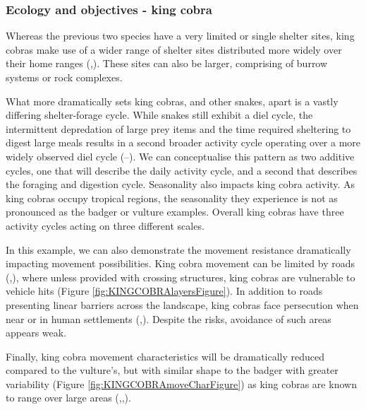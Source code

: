 \documentclass[10pt,a4paper]{article}
\begin{document}
\subsubsection{Ecology and objectives - king cobra}\label{ecology-and-objectives---king-cobra}

Whereas the previous two species have a very limited or single shelter sites, king cobras make use of a wider range of shelter sites distributed more widely over their home ranges (,).
These sites can also be larger, comprising of burrow systems or rock complexes.

What more dramatically sets king cobras, and other snakes, apart is a vastly differing shelter-forage cycle.
While snakes still exhibit a diel cycle, the intermittent depredation of large prey items and the time required sheltering to digest large meals results in a second broader activity cycle operating over a more widely observed diel cycle (--).
We can conceptualise this pattern as two additive cycles, one that will describe the daily activity cycle, and a second that describes the foraging and digestion cycle.
Seasonality also impacts king cobra activity.
As king cobras occupy tropical regions, the seasonality they experience is not as pronounced as the badger or vulture examples.
Overall king cobras have three activity cycles acting on three different scales.

In this example, we can also demonstrate the movement resistance dramatically impacting movement possibilities.
King cobra movement can be limited by roads (,), where unless provided with crossing structures, king cobras are vulnerable to vehicle hits (Figure \ref{fig:KINGCOBRAlayersFigure}).
In addition to roads presenting linear barriers across the landscape, king cobras face persecution when near or in human settlements (,).
Despite the risks, avoidance of such areas appears weak.

Finally, king cobra movement characteristics will be dramatically reduced compared to the vulture's, but with similar shape to the badger with greater variability (Figure \ref{fig:KINGCOBRAmoveCharFigure}) as king cobras are known to range over large areas (,,).
\end{document}
